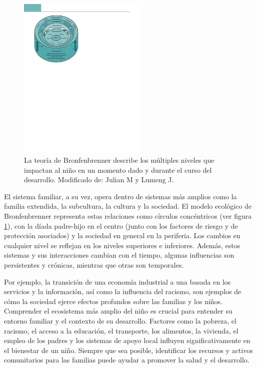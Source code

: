 \documentclass[11pt,letterpaper]{report}
\begin{document}
\begin{figure} %
    \centering
    \includegraphics[width=0.55\textwidth]{sistemasbronfenbrenner}
	\caption{La teoría de Bronfenbrenner describe los múltiples niveles que
	impactan al niño en un momento dado y durante el curso del desarrollo.
	Modificado de: Julian M y Lumeng J. \cite{Feldman3}}
	\label{fig:sistemasbronfenbrenner}
\end{figure}

El sistema familiar, a su vez, opera dentro de sistemas más amplios como la 
familia extendida, la subcultura, la cultura y la sociedad. El modelo ecológico 
de Bronfenbrenner representa estas relaciones como círculos concéntricos (ver
figura \ref{fig:sistemasbronfenbrenner}), con la díada padre-hijo en el centro
(junto con los factores de riesgo y de protección asociados) y la sociedad en
general en la periferia. Los cambios en  cualquier nivel se reflejan en los
niveles superiores e inferiores. Además, estos sistemas y sus interacciones
cambian con el tiempo, algunas influencias  son persistentes y crónicas,
mientras que otras son temporales. \cite{Nelson19}

Por ejemplo, la transición de una economía industrial a una basada en los 
servicios y la información, así como la influencia del racismo, son ejemplos de
cómo la sociedad ejerce efectos profundos sobre las familias y los niños.
Comprender el ecosistema más amplio del niño es crucial para entender su 
entorno familiar y el contexto de su desarrollo. Factores como la pobreza, el 
racismo, el acceso a la educación, el transporte, los alimentos, la vivienda,
el empleo de los padres y los sistemas de apoyo local influyen
significativamente en el bienestar de un niño. Siempre que sea posible, 
identificar los recursos y activos comunitarios para las familias puede ayudar 
a promover la salud y el desarrollo. \cite{Nelson19}
\end{document}
